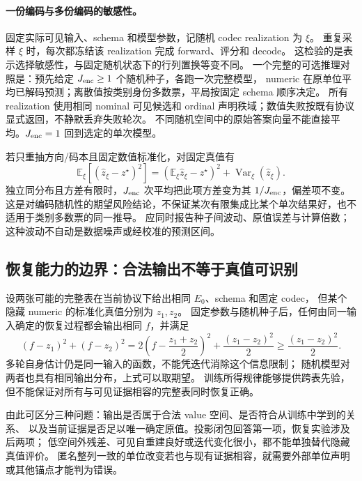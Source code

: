 \documentclass[11pt,UTF8,fontset=fandol]{ctexart}
\numberwithin{equation}{section}
\theoremstyle{definition}
\begin{document}
\paragraph{一份编码与多份编码的敏感性。}
固定实际可见输入、schema 和模型参数，记随机 codec realization 为 $\xi$。
重复采样 $\xi$ 时，每次都冻结该 realization 完成 forward、评分和 decode。
这检验的是表示选择敏感性，与固定随机状态下的行列置换等变不同。
一个完整的可选推理对照是：预先给定 $J_{\rm enc}\ge1$ 个随机种子，各跑一次完整模型，
numeric 在原单位平均已解码预测；离散值按类别身份多数票，平局按固定 schema 顺序决定。
所有 realization 使用相同 nominal 可见候选和 ordinal 声明秩域；数值失败按既有协议显式返回，不静默丢弃失败轮次。
不同随机空间中的原始答案向量不能直接平均。$J_{\rm enc}=1$ 回到选定的单次模型。

若只重抽方向/码本且固定数值标准化，对固定真值有
\begin{equation}
 \mathbb E_\xi[(\widehat z_\xi-z^\star)^2]
 =(\mathbb E_\xi\widehat z_\xi-z^\star)^2
   +\operatorname{Var}_\xi(\widehat z_\xi).
 \label{v53g:eq:codec-risk}
\end{equation}
独立同分布且方差有限时，$J_{\rm enc}$ 次平均把此项方差变为其 $1/J_{\rm enc}$，偏差项不变。
这是对编码随机性的期望风险结论，不保证某次有限集成比某个单次结果好，也不适用于类别多数票的同一推导。
应同时报告种子间波动、原值误差与计算倍数；这种波动不自动是数据噪声或经校准的预测区间。

\subsection{恢复能力的边界：合法输出不等于真值可识别}
\label{v53g:subsec:identifiability}
设两张可能的完整表在当前协议下给出相同 $E_0$、schema 和固定 codec，
但某个隐藏 numeric 的标准化真值分别为 $z_1,z_2$。
固定参数与随机种子后，任何由同一输入确定的恢复过程都会输出相同 $f$，并满足
\begin{equation}
 (f-z_1)^2+(f-z_2)^2
 =2\left(f-\frac{z_1+z_2}{2}\right)^2+\frac{(z_1-z_2)^2}{2}
 \ge\frac{(z_1-z_2)^2}{2}.
 \label{v53g:eq:identifiability}
\end{equation}
多轮自身估计仍是同一输入的函数，不能凭迭代消除这个信息限制；
随机模型对两者也具有相同输出分布，上式可以取期望。
训练所得规律能够提供跨表先验，但不能保证对所有与可见证据相容的完整表同时恢复正确。

由此可区分三种问题：输出是否属于合法 value 空间、是否符合从训练中学到的关系、
以及当前证据是否足以唯一确定原值。投影闭包回答第一项，恢复实验涉及后两项；
低空间外残差、可见自重建良好或迭代变化很小，都不能单独替代隐藏真值评价。
匿名整列一致的单位改变若也与现有证据相容，就需要外部单位声明或其他锚点才能判为错误。
\end{document}
